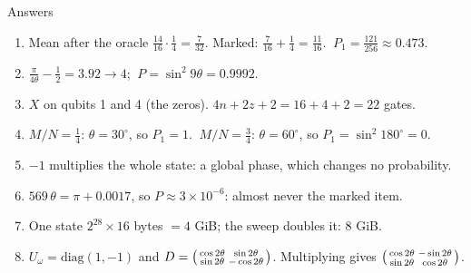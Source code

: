 \documentclass[aspectratio=169,11pt]{beamer}
\newcommand{\Uo}{U_\omega}
\begin{document}
\begin{frame}{Answers}
  \small
  \begin{enumerate}
    \item Mean after the oracle $\frac{14}{16}\cdot\frac14 = \frac{7}{32}$. Marked: $\frac{7}{16} + \frac14 = \frac{11}{16}$. $\ P_1 = \frac{121}{256} \approx 0.473$.
    \item $\frac{\pi}{4\theta} - \frac12 = 3.92 \to 4$; $\ P = \sin^2 9\theta = 0.9992$.
    \item $X$ on qubits 1 and 4 (the zeros). $4n + 2z + 2 = 16 + 4 + 2 = 22$ gates.
    \item $M/N = \frac14$: $\theta = 30^\circ$, so $P_1 = 1$. $\ M/N = \frac34$: $\theta = 60^\circ$, so $P_1 = \sin^2 180^\circ = 0$.
    \item $-1$ multiplies the whole state: a global phase, which changes no probability.
    \item $569\,\theta = \pi + 0.0017$, so $P \approx 3\times10^{-6}$: almost never the marked item.
    \item One state $2^{28}\times16$ bytes $= 4$ GiB; the sweep doubles it: $8$ GiB.
    \item $\Uo = \mathrm{diag}(1, -1)$ and $D = \begin{psmallmatrix}\cos2\theta & \sin2\theta\\ \sin2\theta & -\cos2\theta\end{psmallmatrix}$. Multiplying gives $\begin{psmallmatrix}\cos2\theta & -\sin2\theta\\ \sin2\theta & \cos2\theta\end{psmallmatrix}$.
  \end{enumerate}
\end{frame}
\end{document}
